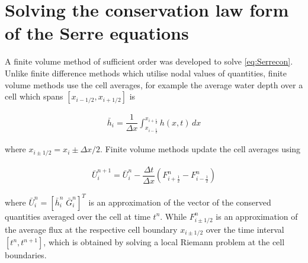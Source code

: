 \documentclass[SingleSpace,12pt,Proceedings]{Serre_ASCE}
\begin{document}
\section{Solving the conservation law form of the Serre equations}
A finite volume method of sufficient order was developed to solve \eqref{eq:Serrecon}. Unlike finite difference methods which utilise nodal values of quantities, finite volume methods use the cell averages, for example the average water depth over a cell which spans $\left[x_{i - 1/2} , x_{i + 1/2}\right]$ is 
\begin{linenomath*}
\begin{gather*}
\bar{h}_i = \dfrac{1}{\Delta x} \int_{x_{i-\frac{1}{2}}}^{x_{i+\frac{1}{2}}} h(x,t) \, dx 
\end{gather*}
\end{linenomath*}
where $x_{i \pm 1/2} = x_i \pm \Delta x/2$. Finite volume methods update the cell averages using
\begin{linenomath*}
\begin{gather}\label{eq:FVMupdate}
\bar{U}^{n+1}_i = \bar{U}^{n}_i - \dfrac{\Delta t}{\Delta x} \left(F^n_{i+ \frac{1}{2}} - F^n_{i - \frac{1}{2}} \right)
\end{gather}
\end{linenomath*}
where $\bar{U}^{n}_i = \left[ \bar{h}^{n}_i \; \bar{G}^{n}_i \right] ^T$ is an approximation of the vector of the conserved quantities averaged over the cell at time $t^n$. While $F^n_{i\pm 1/2}$ is an approximation of the average flux at the respective cell boundary $x_{i \pm 1/2 }$ over the time interval $[t^n, t^{n+1}]$, which is obtained by solving a local Riemann problem at the cell boundaries.
\end{document}
